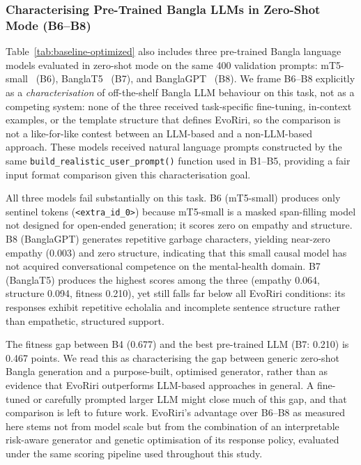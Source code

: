 \documentclass[mathematics,article,xetex,moreauthors]{Definitions/mdpi}
\begin{document}
\subsubsection{Characterising Pre-Trained Bangla LLMs in Zero-Shot Mode (B6--B8)}
\label{sec:llm-baselines}

Table~\ref{tab:baseline-optimized} also includes three pre-trained Bangla
language models evaluated in zero-shot mode on the same 400 validation
prompts: mT5-small~\cite{mt5_2021} (B6), BanglaT5~\cite{banglat5_2022} (B7),
and BanglaGPT~\cite{banglagpt_2023} (B8). We frame B6--B8 explicitly as a
\emph{characterisation} of off-the-shelf Bangla LLM behaviour on this task,
not as a competing system: none of the three received task-specific
fine-tuning, in-context examples, or the template structure that defines
EvoRiri, so the comparison is not a like-for-like contest between an
LLM-based and a non-LLM-based approach. These models received natural
language prompts constructed by the same \texttt{build\_realistic\_user\_prompt()}
function used in B1--B5, providing a fair input format comparison given this
characterisation goal.

All three models fail substantially on this task. B6 (mT5-small) produces
only sentinel tokens (\texttt{<extra\_id\_0>}) because mT5-small is a
masked span-filling model not designed for open-ended generation; it
scores zero on empathy and structure. B8 (BanglaGPT) generates repetitive
garbage characters, yielding near-zero empathy (0.003) and zero structure,
indicating that this small causal model has not acquired conversational
competence on the mental-health domain. B7 (BanglaT5) produces the highest
scores among the three (empathy 0.064, structure 0.094, fitness 0.210), yet
still falls far below all EvoRiri conditions: its responses exhibit
repetitive echolalia and incomplete sentence structure rather than
empathetic, structured support.

The fitness gap between B4 (0.677) and the best pre-trained LLM (B7: 0.210)
is 0.467 points. We read this as characterising the gap between generic
zero-shot Bangla generation and a purpose-built, optimised generator, rather
than as evidence that EvoRiri outperforms LLM-based approaches in general.
A fine-tuned or carefully prompted larger LLM might close much of this gap,
and that comparison is left to future work. EvoRiri's advantage over B6--B8
as measured here stems not from model scale but from the combination of an
interpretable risk-aware generator and genetic optimisation of its response
policy, evaluated under the same scoring pipeline used throughout this study.
\end{document}
